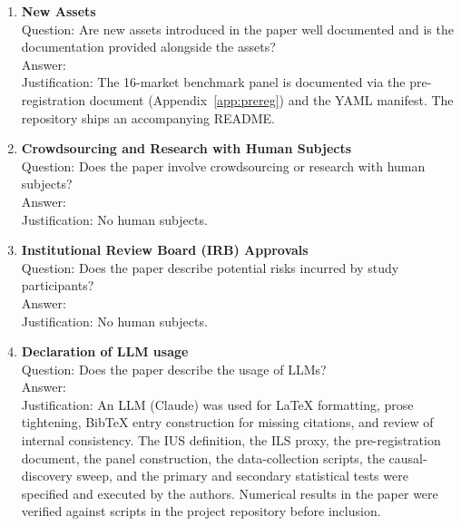 \documentclass{article}
\begin{document}
\begin{enumerate}
\item {\bf New Assets}\\
Question: Are new assets introduced in the paper well documented and is the documentation provided alongside the assets?\\
Answer: \answerYes{}\\
Justification: The 16-market benchmark panel is documented via the pre-registration document (Appendix~\ref{app:prereg}) and the YAML manifest. The repository ships an accompanying README.

\item {\bf Crowdsourcing and Research with Human Subjects}\\
Question: Does the paper involve crowdsourcing or research with human subjects?\\
Answer: \answerNA{}\\
Justification: No human subjects.

\item {\bf Institutional Review Board (IRB) Approvals}\\
Question: Does the paper describe potential risks incurred by study participants?\\
Answer: \answerNA{}\\
Justification: No human subjects.

\item {\bf Declaration of LLM usage}\\
Question: Does the paper describe the usage of LLMs?\\
Answer: \answerYes{}\\
Justification: An LLM (Claude) was used for LaTeX formatting, prose tightening, BibTeX entry construction for missing citations, and review of internal consistency. The IUS definition, the ILS proxy, the pre-registration document, the panel construction, the data-collection scripts, the causal-discovery sweep, and the primary and secondary statistical tests were specified and executed by the authors. Numerical results in the paper were verified against scripts in the project repository before inclusion.

\end{enumerate}
\end{document}
